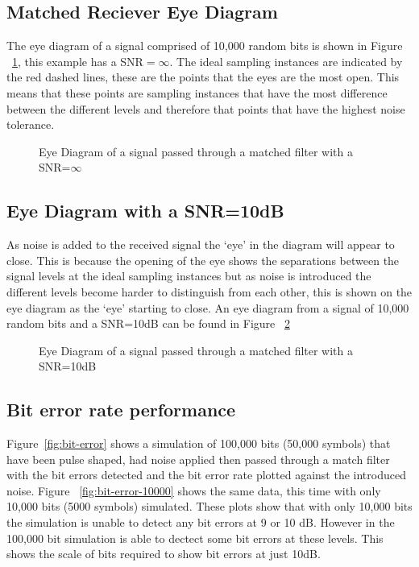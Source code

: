 \subsection{Matched Reciever Eye Diagram}

The eye diagram of a signal comprised of 10,000 random bits is shown in Figure ~\ref{fig:eye-no-noise}, this example has a SNR$=\infty$.
The ideal sampling instances are indicated by the red dashed lines, these are the points that the eyes are the most open. This means that
these points are sampling instances that have the most difference between the different levels and therefore that points that have the highest
noise tolerance.

\begin{figure}[H]
    \begin{center}
        
    \end{center}
    \caption{Eye Diagram of a signal passed through a matched filter with a SNR=$\infty$}
    \label{fig:eye-no-noise}
\end{figure}

\subsection{Eye Diagram with a SNR=10dB}
As noise is added to the received signal the `eye' in the diagram will appear to close. 
This is because the opening of the eye shows the separations between the signal levels
at the ideal sampling instances but as noise is introduced the different levels become
harder to distinguish from each other, this is shown on the eye diagram as the `eye' 
starting to close. An eye diagram from a signal of 10,000 random bits and a SNR=10dB
can be found in Figure ~\ref{fig:eye-noise}

\begin{figure}[H]
    \begin{center}
        
    \end{center}
    \caption{Eye Diagram of a signal passed through a matched filter with a SNR=10dB}
    \label{fig:eye-noise}
\end{figure}

\subsection{Bit error rate performance}
Figure~\ref{fig:bit-error} shows a simulation of 100,000 bits (50,000 symbols) that have
been pulse shaped, had noise applied then passed through a match filter with the bit errors
detected and the bit error rate plotted against the introduced noise. Figure ~\ref{fig:bit-error-10000}
shows the same data, this time with only 10,000 bits (5000 symbols) simulated. These plots
show that with only 10,000 bits the simulation is unable to detect any bit errors at 9 or
10 dB. However in the 100,000 bit simulation is able to dectect some bit errors at these levels.
This shows the scale of bits required to show bit errors at just 10dB.

